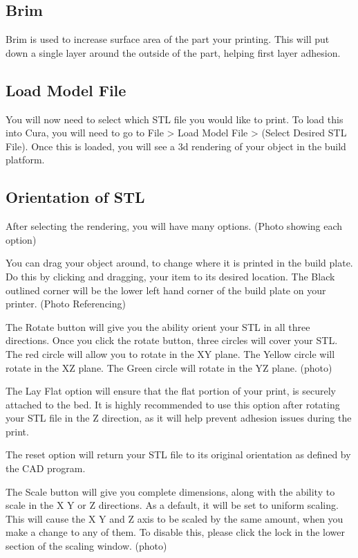 \subsection{Brim}

Brim is used to increase surface area of the part your printing. This will put down a single layer around the outside of the part, helping first layer adhesion.

\subsection{Load Model File}

You will now need to select which STL file you would like to print. To load this into Cura, you will need to go to File > Load Model File > (Select Desired STL File). Once this is loaded, you will see a 3d rendering of your object in the build platform. 

\subsection{Orientation of STL}

After selecting the rendering, you will have many options. (Photo showing each option) 

You can drag your object around, to change where it is printed in the build plate. Do this by clicking and dragging, your item to its desired location. The Black outlined corner will be the lower left hand corner of the build plate on your printer. (Photo Referencing)

The Rotate button will give you the ability orient your STL in all three directions. Once you click the rotate button, three circles will cover your STL. The red circle will allow you to rotate in the XY plane. The Yellow circle will rotate in the XZ plane. The Green circle will rotate in the YZ plane. (photo)

The Lay Flat option will ensure that the flat portion of your print, is securely attached to the bed. It is highly recommended to use this option after rotating your STL file in the Z direction, as it will help prevent adhesion issues during the print.

The reset option will return your STL file to its original orientation as defined by the CAD program. 

The Scale button will give you complete dimensions, along with the ability to scale in the X Y or Z directions. As a default, it will be set to uniform scaling. This will cause the X Y and Z axis to be scaled by the same amount, when you make a change to any of them. To disable this, please click the lock in the lower section of the scaling window. (photo)

